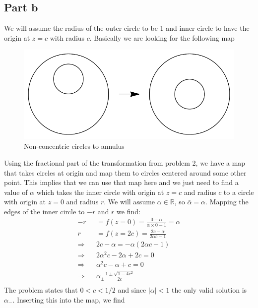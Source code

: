 \documentclass[a4paper,12pt]{article}
\begin{document}
\subsection*{Part b}
We will assume the radius of the outer circle to be 1 and inner circle to have the origin at $z=c$ with radius $c$. Basically we are looking for the following map
\begin{figure}[H]
	\centering
	\includegraphics[width=0.7\linewidth]{map.pdf}
	\caption{Non-concentric circles to annulus}
	\label{fig:4}
\end{figure}
Using the fractional part of the transformation from problem 2, we have a map that takes circles at origin and map them to circles centered around some other point. This implies that we can use that map here and we just need to find a value of $\alpha$ which takes the inner circle with origin at $z=c$ and radius $c$ to a circle with origin at $z=0$ and radius $r$. We will assume $\alpha\in \mathds R$, so $\bar \alpha=\alpha$. Mapping the edges of the inner circle to $-r$ and $r$ we find:
\begin{equation}
\begin{aligned}
-r&=f(z=0)=\frac{0-\alpha}{\alpha\times 0-1}=\alpha
\\
r&=f(z=2c)=\frac{2c-\alpha}{2\alpha c-1}\\
\Rightarrow~~~~&2c-\alpha=-\alpha(2\alpha c-1)\\
\Rightarrow~~~~&2\alpha^2c-2\alpha+2c=0\\
\Rightarrow~~~~&\alpha^2c-\alpha+c=0\\
\Rightarrow~~~~&\alpha_\pm \frac{1\pm\sqrt{1-4c^2}}{2c}\\
\end{aligned}
\end{equation}
The problem states that $0<c<1/2$ and since $|\alpha|<1$ the only valid solution is $\alpha_-$. Inserting this into the map, we find
\end{document}
